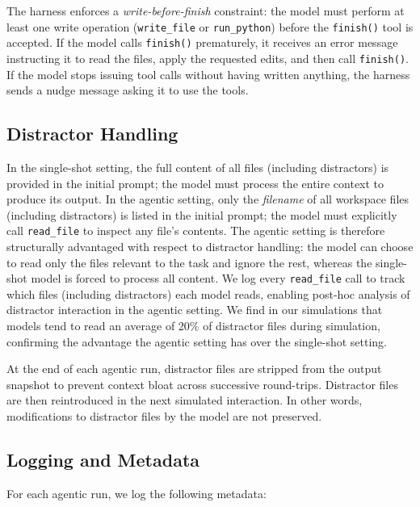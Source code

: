 \documentclass{article} %
\begin{document}
The harness enforces a \textit{write-before-finish} constraint: the model must perform at least one write operation (\texttt{write\_file} or \texttt{run\_python}) before the \texttt{finish()} tool is accepted. If the model calls \texttt{finish()} prematurely, it receives an error message instructing it to read the files, apply the requested edits, and then call \texttt{finish()}. If the model stops issuing tool calls without having written anything, the harness sends a nudge message asking it to use the tools.

\subsection{Distractor Handling}

In the single-shot setting, the full content of all files (including distractors) is provided in the initial prompt; the model must process the entire context to produce its output. In the agentic setting, only the \textit{filename} of all workspace files (including distractors) is listed in the initial prompt; the model must explicitly call \texttt{read\_file} to inspect any file's contents. The agentic setting is therefore structurally advantaged with respect to distractor handling: the model can choose to read only the files relevant to the task and ignore the rest, whereas the single-shot model is forced to process all content. We log every \texttt{read\_file} call to track which files (including distractors) each model reads, enabling post-hoc analysis of distractor interaction in the agentic setting. We find in our simulations that models tend to read an average of 20\% of distractor files during simulation, confirming the advantage the agentic setting has over the single-shot setting.

At the end of each agentic run, distractor files are stripped from the output snapshot to prevent context bloat across successive round-trips. Distractor files are then reintroduced in the next simulated interaction. In other words, modifications to distractor files by the model are not preserved. 

\subsection{Logging and Metadata}

For each agentic run, we log the following metadata:
\end{document}
